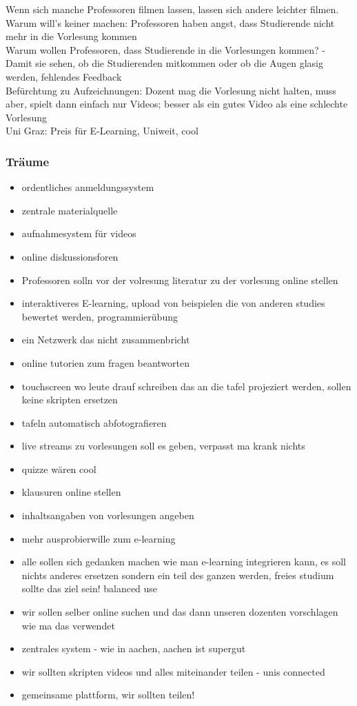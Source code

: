 		Wenn sich manche Professoren filmen lassen, lassen sich andere leichter filmen. \\
		Warum will's keiner machen: Professoren haben angst, dass Studierende nicht mehr in die Vorlesung kommen \\
		Warum wollen Professoren, dass Studierende in die Vorlesungen kommen? - Damit sie sehen, ob die Studierenden mitkommen oder ob die Augen glasig werden, fehlendes Feedback\\

		Befürchtung zu Aufzeichnungen: Dozent mag die Vorlesung nicht halten, muss aber, spielt dann einfach nur Videos;
		besser als ein gutes Video als eine schlechte Vorlesung\\

		Uni Graz: Preis für E-Learning, Uniweit, cool

\subsubsection{Träume}
	\begin{itemize}
		\item ordentliches anmeldungssystem
		\item zentrale materialquelle
		\item aufnahmesystem für videos
		\item online diskussionsforen
		\item Professoren solln vor der volresung literatur zu der vorlesung online stellen
		\item interaktiveres E-learning, upload von beispielen die von anderen studies bewertet werden, programmierübung
		\item ein Netzwerk das nicht zusammenbricht
		\item online tutorien zum fragen beantworten
		\item touchscreen wo leute drauf schreiben das an die tafel projeziert werden, sollen keine skripten ersetzen
		\item tafeln automatisch abfotografieren
		\item live streams zu vorlesungen soll es geben, verpasst ma krank nichts
		\item quizze wären cool
		\item klausuren online stellen
		\item inhaltsangaben von vorlesungen angeben
		\item mehr ausprobierwille zum e-learning
		\item alle sollen sich gedanken machen wie man e-learning integrieren kann, es soll nichts anderes ersetzen sondern ein teil des ganzen werden, freies studium sollte das ziel sein! balanced use
		\item wir sollen selber online suchen und das dann unseren dozenten vorschlagen wie ma das verwendet
		\item zentrales system - wie in aachen, aachen ist supergut
		\item wir sollten skripten videos und alles miteinander teilen - unis connected
		\item gemeinsame plattform, wir sollten teilen!
	\end{itemize}

